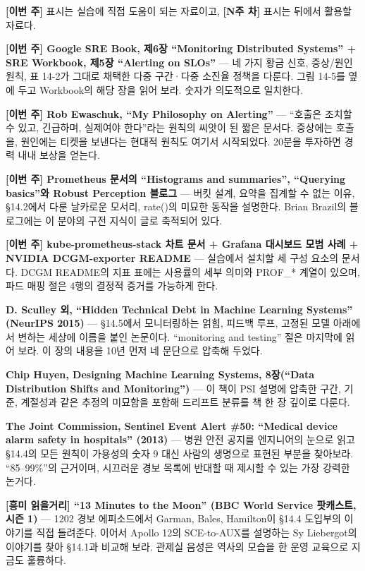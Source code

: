 
\textbf{[이번 주]} 표시는 실습에 직접 도움이 되는 자료이고, \textbf{[N주 차]} 표시는 뒤에서 활용할 자료다.

\begin{tbbitemize}
  \item \textbf{[이번 주] Google SRE Book, 제6장 “Monitoring Distributed Systems” + SRE Workbook, 제5장 “Alerting on SLOs”} — 네 가지 황금 신호, 증상/원인 원칙, 표 14-2가 그대로 채택한 다중 구간·다중 소진율 정책을 다룬다. 그림 14-5를 옆에 두고 Workbook의 해당 장을 읽어 보라. 숫자가 의도적으로 일치한다.
  \item \textbf{[이번 주] Rob Ewaschuk, “My Philosophy on Alerting”} — “호출은 조치할 수 있고, 긴급하며, 실제여야 한다”라는 원칙의 씨앗이 된 짧은 문서다. 증상에는 호출을, 원인에는 티켓을 보낸다는 현대적 원칙도 여기서 시작되었다. 20분을 투자하면 경력 내내 보상을 얻는다.
  \item \textbf{[이번 주] Prometheus 문서의 “Histograms and summaries”, “Querying basics”와 Robust Perception 블로그} — 버킷 설계, 요약을 집계할 수 없는 이유, §14.2에서 다룬 날카로운 모서리, rate()의 미묘한 동작을 설명한다. Brian Brazil의 블로그에는 이 분야의 구전 지식이 글로 축적되어 있다.
  \item \textbf{[이번 주] kube-prometheus-stack 차트 문서 + Grafana 대시보드 모범 사례 + NVIDIA DCGM-exporter README} — 실습에서 설치할 세 구성 요소의 문서다. DCGM README의 지표 표에는 사용률의 세부 의미와 PROF\_* 계열이 있으며, 파드 매핑 절은 4행의 결정적 증거를 가능하게 한다.
  \item \textbf{D. Sculley 외, “Hidden Technical Debt in Machine Learning Systems” (NeurIPS 2015)} — §14.5에서 모니터링하는 얽힘, 피드백 루프, 고정된 모델 아래에서 변하는 세상에 이름을 붙인 논문이다. “monitoring and testing” 절은 마지막에 읽어 보라. 이 장의 내용을 10년 먼저 네 문단으로 압축해 두었다.
  \item \textbf{Chip Huyen, Designing Machine Learning Systems, 8장(“Data Distribution Shifts and Monitoring”)} — 이 책이 PSI 설명에 압축한 구간, 기준, 계절성과 같은 추정의 미묘함을 포함해 드리프트 분류를 책 한 장 깊이로 다룬다.
  \item \textbf{The Joint Commission, Sentinel Event Alert \#50: “Medical device alarm safety in hospitals” (2013)} — 병원 안전 공지를 엔지니어의 눈으로 읽고 §14.4의 모든 원칙이 가용성의 숫자 9 대신 사람의 생명으로 표현된 부분을 찾아보라. “85–99\%”의 근거이며, 시끄러운 경보 목록에 반대할 때 제시할 수 있는 가장 강력한 논거다.
  \item \textbf{[흥미 읽을거리] “13 Minutes to the Moon” (BBC World Service 팟캐스트, 시즌 1)} — 1202 경보 에피소드에서 Garman, Bales, Hamilton이 §14.4 도입부의 이야기를 직접 들려준다. 이어서 Apollo 12의 SCE-to-AUX를 설명하는 Sy Liebergot의 이야기를 찾아 §14.1과 비교해 보라. 관제실 음성은 역사의 모습을 한 운영 교육으로 지금도 훌륭하다.
\end{tbbitemize}

